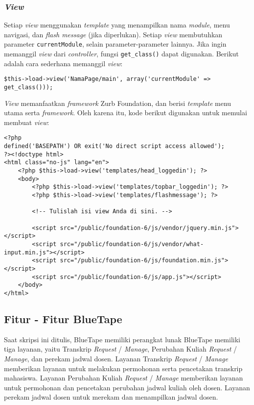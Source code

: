 \subsubsection{\textit{View}}
	Setiap \textit{view} menggunakan \textit{template} yang menampilkan nama \textit{module}, menu navigasi, dan \textit{flash message} (jika diperlukan). Setiap \textit{view} membutuhkan parameter \texttt{currentModule}, selain parameter-parameter lainnya. Jika ingin memanggil \textit{view} dari \textit{controller}, fungsi \texttt{get\_class()} dapat digunakan. Berikut adalah cara sederhana memanggil \textit{view}:  
\begin{lstlisting}
$this->load->view('NamaPage/main', array('currentModule' => get_class()));
\end{lstlisting}

	\textit{View} memanfaatkan \textit{framework} Zurb Foundation, dan berisi \textit{template} menu utama serta \textit{framework}. Oleh karena itu, kode berikut digunakan untuk memulai membuat \textit{view}:
\begin{lstlisting}
<?php
defined('BASEPATH') OR exit('No direct script access allowed');
?><!doctype html>
<html class="no-js" lang="en">
    <?php $this->load->view('templates/head_loggedin'); ?>
    <body>
        <?php $this->load->view('templates/topbar_loggedin'); ?>
        <?php $this->load->view('templates/flashmessage'); ?>

        <!-- Tulislah isi view Anda di sini. -->

        <script src="/public/foundation-6/js/vendor/jquery.min.js"></script>
        <script src="/public/foundation-6/js/vendor/what-input.min.js"></script>
        <script src="/public/foundation-6/js/foundation.min.js"></script>
        <script src="/public/foundation-6/js/app.js"></script>
    </body>
</html>
\end{lstlisting}

\subsection{Fitur - Fitur BlueTape}
	Saat skripsi ini ditulis, BlueTape memiliki perangkat lunak BlueTape memiliki tiga layanan, yaitu Transkrip \textit{Request} / \textit{Manage}, Perubahan Kuliah \textit{Request} / \textit{Manage}, dan perekam jadwal dosen. Layanan Transkrip \textit{Request} / \textit{Manage} memberikan layanan untuk melakukan permohonan serta pencetakan transkrip mahasiswa. Layanan Perubahan Kuliah \textit{Request} / \textit{Manage} memberikan layanan untuk permohonan dan pencetakan perubahan jadwal kuliah oleh dosen. Layanan perekam jadwal dosen untuk merekam dan menampilkan jadwal dosen.

